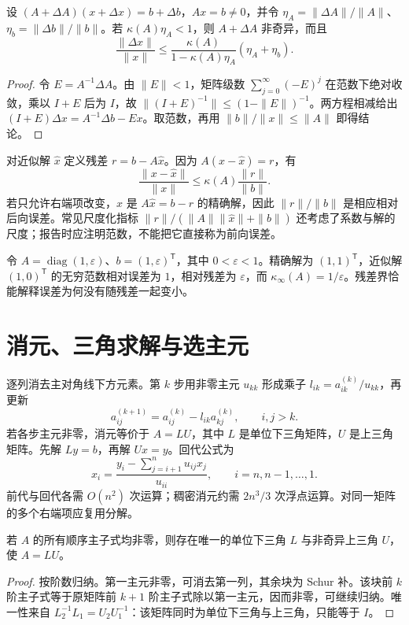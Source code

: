 \documentclass[UTF8,12pt,a4paper,fontset=fandol]{ctexbook}
\begin{document}
\begin{theorem}[系数与右端项同时扰动]
\label{thm:na-linear-perturbation}
设 $(A+\Delta A)(x+\Delta x)=b+\Delta b$，$Ax=b\ne0$，并令 $\eta_A=\|\Delta A\|/\|A\|$、$\eta_b=\|\Delta b\|/\|b\|$。若 $\kappa(A)\eta_A<1$，则 $A+\Delta A$ 非奇异，而且
\[
 \frac{\|\Delta x\|}{\|x\|}\le
 \frac{\kappa(A)}{1-\kappa(A)\eta_A}(\eta_A+\eta_b).
\]
\end{theorem}
\begin{proof}
令 $E=A^{-1}\Delta A$。由 $\|E\|<1$，矩阵级数 $\sum_{j=0}^{\infty}(-E)^j$ 在范数下绝对收敛，乘以 $I+E$ 后为 $I$，故 $\|(I+E)^{-1}\|\le(1-\|E\|)^{-1}$。两方程相减给出 $(I+E)\Delta x=A^{-1}\Delta b-Ex$。取范数，再用 $\|b\|/\|x\|\le\|A\|$ 即得结论。
\end{proof}

对近似解 $\widehat x$ 定义残差 $r=b-A\widehat x$。因为 $A(x-\widehat x)=r$，有
\[
 \frac{\|x-\widehat x\|}{\|x\|}\le\kappa(A)\frac{\|r\|}{\|b\|}.
\]
若只允许右端项改变，$\widehat x$ 是 $A\widehat x=b-r$ 的精确解，因此 $\|r\|/\|b\|$ 是相应相对后向误差。常见尺度化指标 $\|r\|/(\|A\|\|\widehat x\|+\|b\|)$ 还考虑了系数与解的尺度；报告时应注明范数，不能把它直接称为前向误差。

\begin{example}[病态系统中的小残差]
令 $A=\operatorname{diag}(1,\varepsilon)$、$b=(1,\varepsilon)^{\mathsf T}$，其中 $0<\varepsilon<1$。精确解为 $(1,1)^{\mathsf T}$，近似解 $(1,0)^{\mathsf T}$ 的无穷范数相对误差为 $1$，相对残差为 $\varepsilon$，而 $\kappa_\infty(A)=1/\varepsilon$。残差界恰能解释误差为何没有随残差一起变小。
\end{example}

\section{消元、三角求解与选主元}
逐列消去主对角线下方元素。第 $k$ 步用非零主元 $u_{kk}$ 形成乘子 $l_{ik}=a_{ik}^{(k)}/u_{kk}$，再更新
\[
 a_{ij}^{(k+1)}=a_{ij}^{(k)}-l_{ik}a_{kj}^{(k)},\qquad i,j>k.
\]
若各步主元非零，消元等价于 $A=LU$，其中 $L$ 是单位下三角矩阵，$U$ 是上三角矩阵。先解 $Ly=b$，再解 $Ux=y$。回代公式为
\[
 x_i=\frac{y_i-\sum_{j=i+1}^{n}u_{ij}x_j}{u_{ii}},\qquad i=n,n-1,\ldots,1.
\]
前代与回代各需 $O(n^2)$ 次运算；稠密消元约需 $2n^3/3$ 次浮点运算。对同一矩阵的多个右端项应复用分解。

\begin{proposition}
若 $A$ 的所有顺序主子式均非零，则存在唯一的单位下三角 $L$ 与非奇异上三角 $U$，使 $A=LU$。
\end{proposition}
\begin{proof}
按阶数归纳。第一主元非零，可消去第一列，其余块为 Schur 补。该块前 $k$ 阶主子式等于原矩阵前 $k+1$ 阶主子式除以第一主元，因而非零，可继续归纳。唯一性来自 $L_2^{-1}L_1=U_2U_1^{-1}$：该矩阵同时为单位下三角与上三角，只能等于 $I$。
\end{proof}
\end{document}
